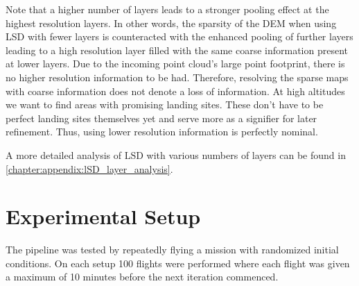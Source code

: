 Note that a higher number of layers leads to a stronger pooling effect at the highest resolution layers. In other words, the sparsity of the DEM when using LSD with fewer layers is counteracted with the enhanced pooling of further layers leading to a high resolution layer filled with the same coarse information present at lower layers. Due to the incoming point cloud's large point footprint, there is no higher resolution information to be had. Therefore, resolving the sparse maps with coarse information does not denote a loss of information. At high altitudes we want to find areas with promising landing sites. These don't have to be perfect landing sites themselves yet and serve more as a signifier for later refinement. Thus, using lower resolution information is perfectly nominal.

A more detailed analysis of LSD with various numbers of layers can be found in \cref{chapter:appendix:lSD_layer_analysis}.

\section{Experimental Setup}\label{sec:exp_setup}

The pipeline was tested by repeatedly flying a mission with randomized initial conditions. On each setup 100 flights were performed where each flight was given a maximum of 10 minutes before the next iteration commenced.
